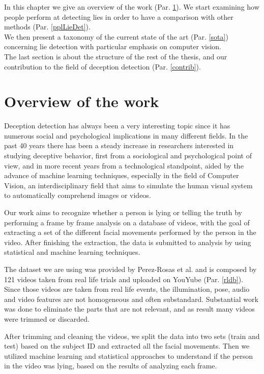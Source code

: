 In this chapter we give an overview of the work (Par. \ref{overview}). We start examining how people perform at detecting lies in order to have a comparison with other methods (Par. \ref{pplLieDet}). \\
We then present a taxonomy of the current state of the art (Par. \ref{sota}) concerning lie detection with particular emphasis on computer vision. \\
The last section is about the structure of the rest of the thesis, and our contribution to the field of deception detection (Par. \ref{contrib}).

\section{Overview of the work} \label{overview}
Deception detection has always been a very interesting topic since it has numerous social and psychological implications in many different fields. In the past 40 years there has been a steady increase in researchers interested in studying deceptive behavior, first from a sociological and psychological point of view, and in more recent years from a technological standpoint, aided by the advance of machine learning techniques, especially in the field of Computer Vision, an interdisciplinary field that aims to simulate the human visual system to automatically comprehend images or videos.

Our work aims to recognize whether a person is lying or telling the truth by performing a frame by frame analysis on a database of videos, with the goal of extracting a set of the different facial movements performed by the person in the video. After finishing the extraction, the data is submitted to analysis by using statistical and machine learning techniques.

The dataset we are using was provided by Perez-Rosas et al. \cite{Perez-Rosas:2015:DDU:2818346.2820758} and is composed by 121 videos taken from real life trials and uploaded on YouYube (Par. \ref{rldb}). Since those videos are taken from real life events, the illumination, pose, audio and video features are not homogeneous and often substandard. Substantial work was done to eliminate the parts that are not relevant, and as result many videos were trimmed or discarded.

After trimming and cleaning the videos, we split the data into two sets (train and test) based on the subject ID and extracted all the facial movements. Then we utilized machine learning and statistical approaches to understand if the person in the video was lying, based on the results of analyzing each frame.

